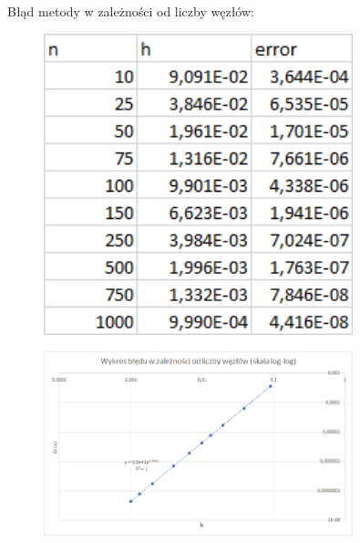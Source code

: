 \newpage

\begin{samepage}
Błąd metody w zależności od liczby węzłów:
    \begin{figure}[!ht]
        \begin{center}
\includegraphics[width=0.8\textwidth]{Lab4/charts/zad1/error_dane.png}
        \end{center}
    \end{figure}
    \FloatBarrier
\end{samepage} 

\begin{samepage}
    
    \begin{figure}[!ht]
        \begin{center}
\includegraphics[width=0.8\textwidth]{Lab4/charts/zad1/error.png}
        \end{center}
    \end{figure}
    \FloatBarrier
\end{samepage} 


